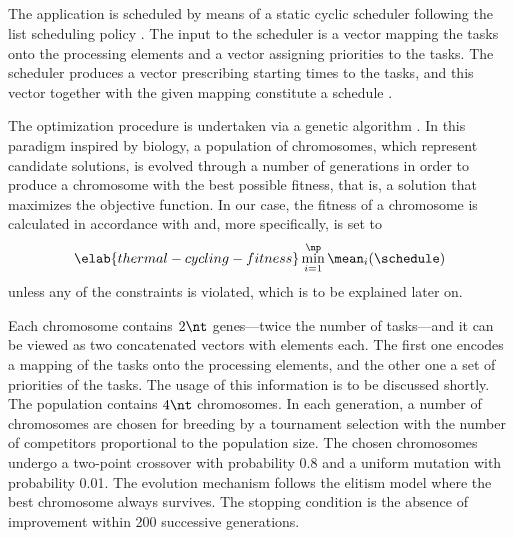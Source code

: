 \subsection{\solutiontitle}

The application is scheduled by means of a static cyclic scheduler following the
list scheduling policy \cite{adam1974}. The input to the scheduler is a vector
mapping the tasks onto the processing elements and a vector assigning priorities
to the tasks. The scheduler produces a vector prescribing starting times to the
tasks, and this vector together with the given mapping constitute a schedule
\schedule.

The optimization procedure is undertaken via a genetic algorithm
\cite{schmitz2004}. In this paradigm inspired by biology, a population of
chromosomes, which represent candidate solutions, is evolved through a number of
generations in order to produce a chromosome with the best possible fitness,
that is, a solution that maximizes the objective function. In our case, the
fitness of a chromosome is calculated in accordance with
 and, more specifically, is set to
\begin{equation} \elab{thermal-cycling-fitness}
  \min_{i = 1}^\np \mean_i(\schedule)
\end{equation}
unless any of the constraints is violated, which is to be explained later on.

Each chromosome contains $2 \nt$ genes---twice the number of tasks---and it can
be viewed as two concatenated vectors with \nt elements each. The first one
encodes a mapping of the tasks onto the processing elements, and the other one a
set of priorities of the tasks. The usage of this information is to be discussed
shortly. The population contains $4 \nt$ chromosomes. In each generation, a
number of chromosomes are chosen for breeding by a tournament selection with the
number of competitors proportional to the population size. The chosen
chromosomes undergo a two-point crossover with probability 0.8 and a uniform
mutation with probability 0.01. The evolution mechanism follows the elitism
model where the best chromosome always survives. The stopping condition is the
absence of improvement within 200 successive generations.

